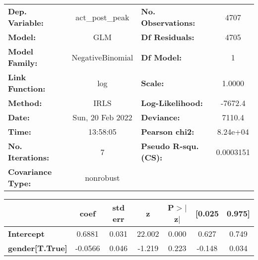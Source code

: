 \begin{center}
\begin{tabular}{lclc}
\toprule
\textbf{Dep. Variable:}   & act\_post\_peak  & \textbf{  No. Observations:  } &     4707    \\
\textbf{Model:}           &       GLM        & \textbf{  Df Residuals:      } &     4705    \\
\textbf{Model Family:}    & NegativeBinomial & \textbf{  Df Model:          } &        1    \\
\textbf{Link Function:}   &       log        & \textbf{  Scale:             } &    1.0000   \\
\textbf{Method:}          &       IRLS       & \textbf{  Log-Likelihood:    } &   -7672.4   \\
\textbf{Date:}            & Sun, 20 Feb 2022 & \textbf{  Deviance:          } &    7110.4   \\
\textbf{Time:}            &     13:58:05     & \textbf{  Pearson chi2:      } &  8.24e+04   \\
\textbf{No. Iterations:}  &        7         & \textbf{  Pseudo R-squ. (CS):} & 0.0003151   \\
\textbf{Covariance Type:} &    nonrobust     & \textbf{                     } &             \\
\bottomrule
\end{tabular}
\begin{tabular}{lcccccc}
                        & \textbf{coef} & \textbf{std err} & \textbf{z} & \textbf{P$> |$z$|$} & \textbf{[0.025} & \textbf{0.975]}  \\
\midrule
\textbf{Intercept}      &       0.6881  &        0.031     &    22.002  &         0.000        &        0.627    &        0.749     \\
\textbf{gender[T.True]} &      -0.0566  &        0.046     &    -1.219  &         0.223        &       -0.148    &        0.034     \\
\bottomrule
\end{tabular}
\end{center}